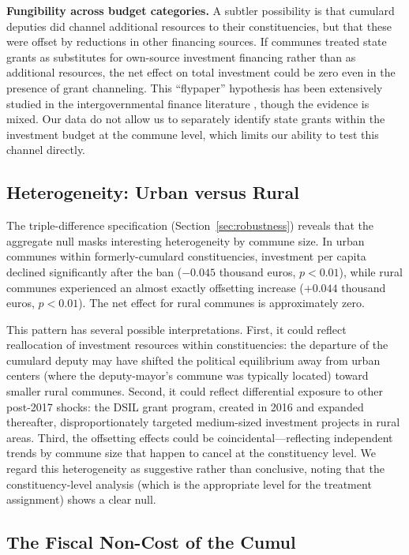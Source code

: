 \documentclass[12pt]{article}
\begin{document}
\textbf{Fungibility across budget categories.} A subtler possibility is that cumulard deputies did channel additional resources to their constituencies, but that these were offset by reductions in other financing sources. If communes treated state grants as substitutes for own-source investment financing rather than as additional resources, the net effect on total investment could be zero even in the presence of grant channeling. This ``flypaper'' hypothesis has been extensively studied in the intergovernmental finance literature \citep{cagetti2014fiscal}, though the evidence is mixed. Our data do not allow us to separately identify state grants within the investment budget at the commune level, which limits our ability to test this channel directly.

\subsection{Heterogeneity: Urban versus Rural}

The triple-difference specification (Section~\ref{sec:robustness}) reveals that the aggregate null masks interesting heterogeneity by commune size. In urban communes within formerly-cumulard constituencies, investment per capita declined significantly after the ban ($-0.045$ thousand euros, $p < 0.01$), while rural communes experienced an almost exactly offsetting increase ($+0.044$ thousand euros, $p < 0.01$). The net effect for rural communes is approximately zero.

This pattern has several possible interpretations. First, it could reflect reallocation of investment resources within constituencies: the departure of the cumulard deputy may have shifted the political equilibrium away from urban centers (where the deputy-mayor's commune was typically located) toward smaller rural communes. Second, it could reflect differential exposure to other post-2017 shocks: the DSIL grant program, created in 2016 and expanded thereafter, disproportionately targeted medium-sized investment projects in rural areas. Third, the offsetting effects could be coincidental---reflecting independent trends by commune size that happen to cancel at the constituency level. We regard this heterogeneity as suggestive rather than conclusive, noting that the constituency-level analysis (which is the appropriate level for the treatment assignment) shows a clear null.

\subsection{The Fiscal Non-Cost of the Cumul}
\end{document}
